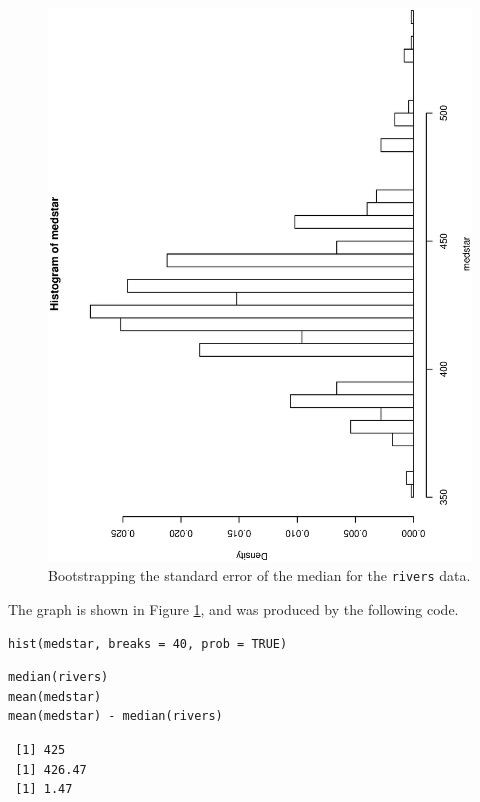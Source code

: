 \documentclass[captions=tableheading]{scrbook}
\begin{document}
\begin{example}
\begin{figure}[th]
  \includegraphics[angle=270, totalheight=4in]{ps/resamp/Bootstrapping-se-median.ps}
  \caption[Bootstrapping the standard error of the median for the \texttt{rivers} data]{\small Bootstrapping the standard error of the median for the \texttt{rivers} data.}
  \label{fig-Bootstrapping-se-median}
\end{figure}


The graph is shown in Figure \ref{fig-Bootstrapping-se-median}, and was produced by the following code.


\begin{verbatim}
hist(medstar, breaks = 40, prob = TRUE)
\end{verbatim}


\begin{verbatim}
median(rivers)
mean(medstar)
mean(medstar) - median(rivers)
\end{verbatim}

\begin{verbatim}
 [1] 425
 [1] 426.47
 [1] 1.47
\end{verbatim}

\end{example}
\end{document}
